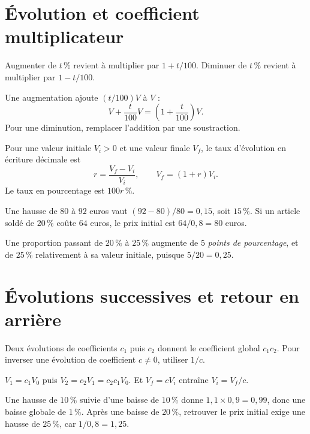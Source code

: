 \documentclass[../cours_3e.tex]{subfiles}
\begin{document}
\section{Évolution et coefficient multiplicateur}
\begin{propriete}
Augmenter de $t\,\%$ revient à multiplier par $1+t/100$.
Diminuer de $t\,\%$ revient à multiplier par $1-t/100$.
\end{propriete}
\begin{demonstration}
Une augmentation ajoute $(t/100)V$ à $V$ :
\[V+\frac{t}{100}V=\left(1+\frac{t}{100}\right)V.\]
Pour une diminution, remplacer l'addition par une soustraction.
\end{demonstration}
\begin{definition}
Pour une valeur initiale $V_i>0$ et une valeur finale $V_f$, le taux d'évolution en écriture décimale est
\[r=\frac{V_f-V_i}{V_i},\qquad V_f=(1+r)V_i.\]
Le taux en pourcentage est $100r\,\%$.
\end{definition}
Une hausse de $80$ à $92$ euros vaut $(92-80)/80=0{,}15$, soit $15\,\%$.
Si un article soldé de $20\,\%$ coûte $64$ euros, le prix initial est $64/0{,}8=80$ euros.
\begin{attention}
Une proportion passant de $20\,\%$ à $25\,\%$ augmente de $5$ \emph{points de pourcentage}, et de $25\,\%$ relativement à sa valeur initiale, puisque $5/20=0{,}25$.
\end{attention}
\section{Évolutions successives et retour en arrière}
\begin{propriete}
Deux évolutions de coefficients $c_1$ puis $c_2$ donnent le coefficient global $c_1c_2$. Pour inverser une évolution de coefficient $c\ne0$, utiliser $1/c$.
\end{propriete}
\begin{demonstration}
$V_1=c_1V_0$ puis $V_2=c_2V_1=c_2c_1V_0$. Et $V_f=cV_i$ entraîne $V_i=V_f/c$.
\end{demonstration}
Une hausse de $10\,\%$ suivie d'une baisse de $10\,\%$ donne $1{,}1\times0{,}9=0{,}99$, donc une baisse globale de $1\,\%$. Après une baisse de $20\,\%$, retrouver le prix initial exige une hausse de $25\,\%$, car $1/0{,}8=1{,}25$.
\end{document}

